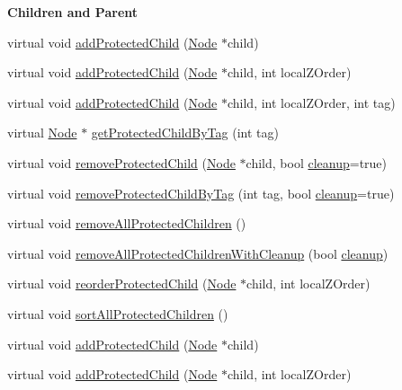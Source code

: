 \begin{Indent}\textbf{ Children and Parent}\par
\begin{DoxyCompactItemize}
\item 
virtual void \hyperlink{classProtectedNode_ad36ce9f2e11226af49dec57aae1da4be}{add\+Protected\+Child} (\hyperlink{classNode}{Node} $\ast$child)
\item 
virtual void \hyperlink{classProtectedNode_a9f7688935e62904baacae03e8f2c2070}{add\+Protected\+Child} (\hyperlink{classNode}{Node} $\ast$child, int local\+Z\+Order)
\item 
virtual void \hyperlink{classProtectedNode_a5fa7088c0b7baa650d62537a85e1c134}{add\+Protected\+Child} (\hyperlink{classNode}{Node} $\ast$child, int local\+Z\+Order, int tag)
\item 
virtual \hyperlink{classNode}{Node} $\ast$ \hyperlink{classProtectedNode_a91e0476a6296c1d45d7859acace15d7d}{get\+Protected\+Child\+By\+Tag} (int tag)
\item 
virtual void \hyperlink{classProtectedNode_a0d5d30ee7194e85b5b607b428ab366ab}{remove\+Protected\+Child} (\hyperlink{classNode}{Node} $\ast$child, bool \hyperlink{classProtectedNode_a5462a6202b458193c1881bcdcc5be78d}{cleanup}=true)
\item 
virtual void \hyperlink{classProtectedNode_a3acbf045580d1acbef9b63e812eb17c0}{remove\+Protected\+Child\+By\+Tag} (int tag, bool \hyperlink{classProtectedNode_a5462a6202b458193c1881bcdcc5be78d}{cleanup}=true)
\item 
virtual void \hyperlink{classProtectedNode_acf7715345d19c9842db467ffc7345585}{remove\+All\+Protected\+Children} ()
\item 
virtual void \hyperlink{classProtectedNode_a0046f13e110ee0de2d038a85cd3f75c6}{remove\+All\+Protected\+Children\+With\+Cleanup} (bool \hyperlink{classProtectedNode_a5462a6202b458193c1881bcdcc5be78d}{cleanup})
\item 
virtual void \hyperlink{classProtectedNode_a6386f04b4d8b7a3e12c65b455d6bcf38}{reorder\+Protected\+Child} (\hyperlink{classNode}{Node} $\ast$child, int local\+Z\+Order)
\item 
virtual void \hyperlink{classProtectedNode_a9be3508a853fd1c6e841b4ba50f4e1c8}{sort\+All\+Protected\+Children} ()
\item 
virtual void \hyperlink{classProtectedNode_a209c517b7a0b0f4dd1d0e0da97eff58d}{add\+Protected\+Child} (\hyperlink{classNode}{Node} $\ast$child)
\item 
virtual void \hyperlink{classProtectedNode_acb1ea1deb4ab6e3bb46fd0947fef1d8b}{add\+Protected\+Child} (\hyperlink{classNode}{Node} $\ast$child, int local\+Z\+Order)

\end{DoxyCompactItemize}
\end{Indent}
